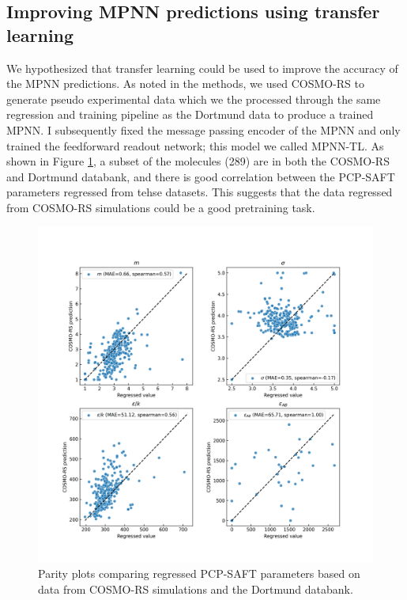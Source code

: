 \subsection{Improving MPNN predictions using transfer learning}

We hypothesized that transfer learning could be used to improve the accuracy of the MPNN predictions. As noted in the methods, we used COSMO-RS\cite{Klamt1995, Klamt2010} to generate pseudo experimental data which we the processed through the same regression and training pipeline as the Dortmund data to produce a trained MPNN. I subsequently fixed the message passing encoder of the MPNN and only trained the feedforward readout network; this model we called MPNN-TL. As shown in Figure \ref{fig:cosmo_dortmund}, a subset of the molecules (289) are in both the COSMO-RS and Dortmund databank, and there is good correlation between the PCP-SAFT parameters regressed from tehse datasets. This suggests that the data regressed from  COSMO-RS simulations could be a good pretraining task. 

\begin{figure}
    \centering
    \includegraphics[width=\textwidth]{gfx/Chapter08/cosmo_dortmund_parameter_correlations.png}
    \caption{Parity plots comparing regressed PCP-SAFT parameters based on data from COSMO-RS simulations and the Dortmund databank.}
    \label{fig:cosmo_dortmund}
\end{figure}

